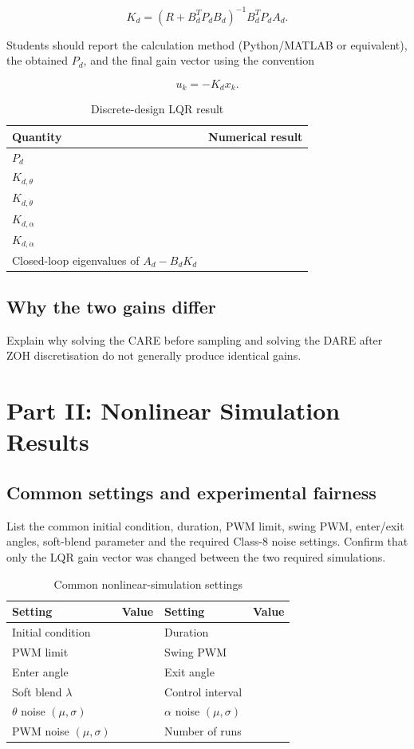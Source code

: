 \documentclass[11pt,a4paper]{article}
\newcommand{\studenttext}[1]{\begin{studentbox}\vspace{#1}\end{studentbox}}
\begin{document}
\[
\boxed{
K_d=
(R+B_d^TP_dB_d)^{-1}
B_d^TP_dA_d
}.
\]

Students should report the calculation method (Python/MATLAB or equivalent),
the obtained $P_d$, and the final gain vector using the convention

\[
u_k=-K_dx_k .
\]


\begin{table}[H]
\centering
\caption{Discrete-design LQR result}
\label{tab:kd}
\begin{tabular}{lc}
\toprule
Quantity & Numerical result\\
\midrule
$P_d$ & \\[1mm]
$K_{d,\theta}$ & \\
$K_{d,\dot\theta}$ & \\
$K_{d,\alpha}$ & \\
$K_{d,\dot\alpha}$ & \\
Closed-loop eigenvalues of $A_d-B_dK_d$ & \\
\bottomrule
\end{tabular}
\end{table}
\subsection{Why the two gains differ}

Explain why solving the CARE before sampling and solving the DARE after ZOH
discretisation do not generally produce identical gains.

\studenttext{30mm}

\section{Part II: Nonlinear Simulation Results}
\label{sec:simulation}

\subsection{Common settings and experimental fairness}

List the common initial condition, duration, PWM limit, swing PWM, enter/exit
angles, soft-blend parameter and the required Class-8 noise settings. Confirm
that only the LQR gain vector was changed between the two required simulations.

\begin{table}[H]
\centering
\caption{Common nonlinear-simulation settings}
\label{tab:simsettings}
\begin{tabular}{ll@{\qquad}ll}
\toprule
Setting & Value & Setting & Value\\
\midrule
Initial condition & & Duration & \\
PWM limit & & Swing PWM & \\
Enter angle & & Exit angle & \\
Soft blend $\lambda$ & & Control interval & \\
$\theta$ noise $(\mu,\sigma)$ & & $\alpha$ noise $(\mu,\sigma)$ & \\
PWM noise $(\mu,\sigma)$ & & Number of runs & \\
\bottomrule
\end{tabular}
\end{table}
\end{document}
